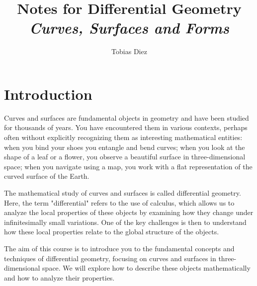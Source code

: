 \documentclass[10pt]{article}
\begin{document}
    \title{{Notes for Differential Geometry}
        \\{\normalsize{\itshape Curves, Surfaces and Forms}}}
    \author{Tobias Diez}
    
    \maketitle

    \section*{Introduction}

    Curves and surfaces are fundamental objects in geometry and have been studied for thousands of years. 
    You have encountered them in various contexts, perhaps often without explicitly recognizing them as interesting mathematical entities: when you bind your shoes you entangle and bend curves; when you look at the shape of a leaf or a flower, you observe a beautiful surface in three-dimensional space; when you navigate using a map, you work with a flat representation of the curved surface of the Earth.
    
    The mathematical study of curves and surfaces is called differential geometry.
    Here, the term "differential" refers to the use of calculus, which allows us to analyze the local properties of these objects by examining how they change under infinitesimally small variations. One of the key challenges is then to understand how these local properties relate to the global structure of the objects.

    The aim of this course is to introduce you to the fundamental concepts and techniques of differential geometry, focusing on curves and surfaces in three-dimensional space.
    We will explore how to describe these objects mathematically and how to analyze their properties.
\end{document}
